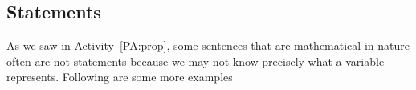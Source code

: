 %

\subsection*{Statements}
As we saw in \typeu Activity~\ref*{PA:prop}, some sentences that are mathematical in nature often are not statements because we may not know precisely what a variable represents.  Following are some more examples


